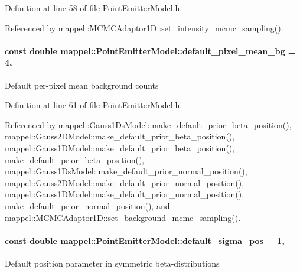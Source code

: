 Definition at line 58 of file Point\+Emitter\+Model.\+h.



Referenced by mappel\+::\+M\+C\+M\+C\+Adaptor1\+D\+::set\+\_\+intensity\+\_\+mcmc\+\_\+sampling().

\paragraph[{\texorpdfstring{default\+\_\+pixel\+\_\+mean\+\_\+bg}{default_pixel_mean_bg}}]{\setlength{\rightskip}{0pt plus 5cm}const double mappel\+::\+Point\+Emitter\+Model\+::default\+\_\+pixel\+\_\+mean\+\_\+bg = 4\hspace{0.3cm}{\ttfamily [static]}, {\ttfamily [inherited]}}\hypertarget{classmappel_1_1PointEmitterModel_abe82d75be8586234657a61e2f137a6c8}{}\label{classmappel_1_1PointEmitterModel_abe82d75be8586234657a61e2f137a6c8}
Default per-\/pixel mean background counts 

Definition at line 61 of file Point\+Emitter\+Model.\+h.



Referenced by mappel\+::\+Gauss1\+Ds\+Model\+::make\+\_\+default\+\_\+prior\+\_\+beta\+\_\+position(), mappel\+::\+Gauss2\+D\+Model\+::make\+\_\+default\+\_\+prior\+\_\+beta\+\_\+position(), mappel\+::\+Gauss1\+D\+Model\+::make\+\_\+default\+\_\+prior\+\_\+beta\+\_\+position(), make\+\_\+default\+\_\+prior\+\_\+beta\+\_\+position(), mappel\+::\+Gauss1\+Ds\+Model\+::make\+\_\+default\+\_\+prior\+\_\+normal\+\_\+position(), mappel\+::\+Gauss2\+D\+Model\+::make\+\_\+default\+\_\+prior\+\_\+normal\+\_\+position(), mappel\+::\+Gauss1\+D\+Model\+::make\+\_\+default\+\_\+prior\+\_\+normal\+\_\+position(), make\+\_\+default\+\_\+prior\+\_\+normal\+\_\+position(), and mappel\+::\+M\+C\+M\+C\+Adaptor1\+D\+::set\+\_\+background\+\_\+mcmc\+\_\+sampling().

\paragraph[{\texorpdfstring{default\+\_\+sigma\+\_\+pos}{default_sigma_pos}}]{\setlength{\rightskip}{0pt plus 5cm}const double mappel\+::\+Point\+Emitter\+Model\+::default\+\_\+sigma\+\_\+pos = 1\hspace{0.3cm}{\ttfamily [static]}, {\ttfamily [inherited]}}\hypertarget{classmappel_1_1PointEmitterModel_aa98a73b9e3937c00b07596d3928df3ca}{}\label{classmappel_1_1PointEmitterModel_aa98a73b9e3937c00b07596d3928df3ca}
Default position parameter in symmetric beta-\/distributions 

